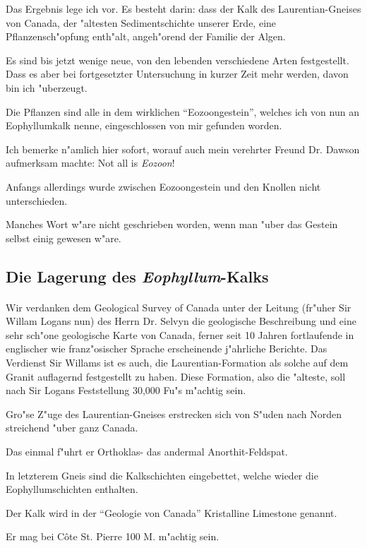 \documentclass[a4paper, 11pt, oneside, german]{article}
\begin{document}
Das Ergebnis lege ich vor. Es besteht darin: dass der Kalk des Laurentian-Gneises von Canada, der "altesten Sedimentschichte unserer Erde, eine Pflanzensch"opfung enth"alt, angeh"orend der Familie der Algen.

Es sind bis jetzt wenige neue, von den lebenden verschiedene Arten festgestellt. Dass es aber bei fortgesetzter Untersuchung in kurzer Zeit mehr werden, davon bin ich "uberzeugt.

Die Pflanzen sind alle in dem wirklichen "`Eozoongestein"', welches ich von nun an Eophyllumkalk nenne, eingeschlossen von mir gefunden worden.

Ich bemerke n"amlich hier sofort, worauf auch mein verehrter Freund Dr. Dawson aufmerksam machte: Not all is \emph{Eozoon}!

Anfangs allerdings wurde zwischen Eozoongestein und den Knollen nicht unterschieden.

Manches Wort w"are nicht geschrieben worden, wenn man "uber das Gestein selbst einig gewesen w"are.
\clearpage
\subsection{Die Lagerung des \emph{Eophyllum}-Kalks}
\paragraph{}
Wir verdanken dem Geological Survey of Canada unter der Leitung (fr"uher Sir Willam Logans nun) des Herrn Dr. Selvyn die geologische Beschreibung und eine sehr sch"one geologische Karte von Canada, ferner seit 10 Jahren fortlaufende in englischer wie franz"osischer Sprache erscheinende j"ahrliche Berichte. Das Verdienst Sir Willams ist es auch, die Laurentian-Formation als solche auf dem Granit auflagernd festgestellt zu haben. Diese Formation, also die "alteste, soll nach Sir Logans Feststellung 30,000 Fu"s m"achtig sein.

Gro"se Z"uge des Laurentian-Gneises erstrecken sich von S"uden nach Norden streichend "uber ganz Canada.

Das einmal f"uhrt er Orthoklas- das andermal Anorthit-Feldspat.

In letzterem Gneis sind die Kalkschichten eingebettet, welche wieder die Eophyllumschichten enthalten.

Der Kalk wird in der "`Geologie von Canada"' Kristalline Limestone genannt.

Er mag bei Côte St. Pierre 100 M. m"achtig sein.
\end{document}

